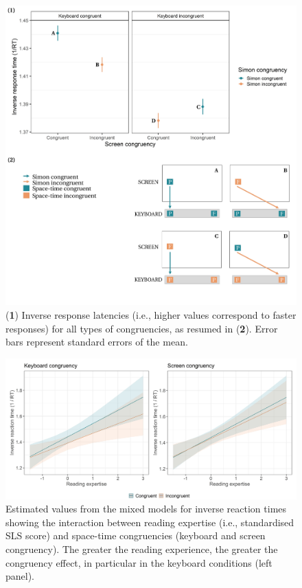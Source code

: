 \documentclass[
  a4paper,12pt,twoside,onecolumn,openright,final,oldfontcommands]{memoir}
\begin{document}
\begin{figure}[htbp!]

{\centering \includegraphics[width=1\linewidth]{figures/chap-5-fig3} 

}

\caption{(\textbf{1}) Inverse response latencies (i.e., higher values correspond to faster responses) for all types of congruencies, as resumed in (\textbf{2}). Error bars represent standard errors of the mean.}\label{fig:chap-5-fig3}
\end{figure}

\begin{figure}[htbp!]

{\centering \includegraphics[width=1\linewidth]{figures/chap-5-fig4} 

}

\caption{Estimated values from the mixed models for inverse reaction times showing the interaction between reading expertise (i.e., standardised SLS score) and space-time congruencies (keyboard and screen congruency). The greater the reading experience, the greater the congruency effect, in particular in the keyboard conditions (left panel).}\label{fig:chap-5-fig4}
\end{figure}
\end{document}
